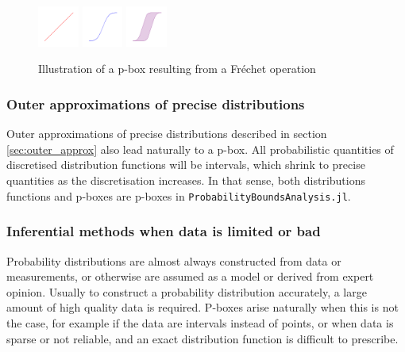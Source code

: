 \documentclass{juliacon}
\begin{document}
\begin{figure}[htp]

  \centering
  \includegraphics[width=0.12\textwidth]{../examples/JuliaCon/fig5/fig5_dist1.pdf}
  \includegraphics[width=0.12\textwidth]{../examples/JuliaCon/fig5/fig5_dist2.pdf}
  \raisebox{9.0mm}{{\Large$\rightarrow$}}
  \includegraphics[width=0.12\textwidth]{../examples/JuliaCon/fig5/fig5_pbox.pdf}
  

  \caption{Illustration of a p-box resulting from a Fréchet operation}
  \label{fig:figure5}
  
\end{figure}


\subsubsection{Outer approximations of precise distributions} \hfill \break

Outer approximations of precise distributions described in section \ref{sec:outer_approx} also lead naturally to a p-box. All probabilistic quantities of discretised distribution functions will be intervals, which shrink to precise quantities as the discretisation increases. In that sense, both distributions functions and p-boxes are p-boxes in \texttt{ProbabilityBoundsAnalysis.jl}.

\subsubsection{Inferential methods when data is limited or bad} \hfill \break

Probability distributions are almost always constructed from data or measurements, or otherwise are assumed as a model or derived from expert opinion. Usually to construct a probability distribution accurately, a large amount of high quality data is required. P-boxes arise naturally when this is not the case, for example if the data are intervals instead of points, or when data is sparse or not reliable, and an exact distribution function is difficult to prescribe.
\end{document}
